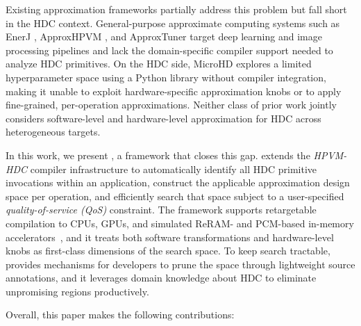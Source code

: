 Existing approximation frameworks partially address this problem but fall short in the HDC context. General-purpose approximate computing systems such as EnerJ \cite{enerJ}, ApproxHPVM \cite{approxhpvm}, and ApproxTuner \cite{approxtuner} target deep learning and image processing pipelines and lack the domain-specific compiler support needed to analyze HDC primitives. On the HDC side, MicroHD \cite{microhd} explores a limited hyperparameter space using a Python library without compiler integration, making it unable to exploit hardware-specific approximation knobs or to apply fine-grained, per-operation approximations. Neither class of prior work jointly considers software-level and hardware-level approximation for HDC across heterogeneous targets.

In this work, we present \pname{}, a framework that closes this gap. \pname{} extends the \textit{HPVM-HDC} compiler infrastructure \cite{hpvm-hdc} to automatically identify all HDC primitive invocations within an application, construct the applicable approximation design space per operation, and efficiently search that space subject to a user-specified \textit{quality-of-service (QoS)} constraint. The framework supports retargetable compilation to CPUs, GPUs, and simulated ReRAM- and PCM-based in-memory accelerators~\cite{ReRAMAcc, SpecPCM2024}, and it treats both software transformations  and hardware-level knobs  as first-class dimensions of the search space. To keep search tractable, \pname{} provides mechanisms for developers to prune the space through lightweight source annotations, and it leverages domain knowledge about HDC to eliminate unpromising regions productively.

\vspace{0.05in}
\noindent
Overall, this paper makes the following contributions:

